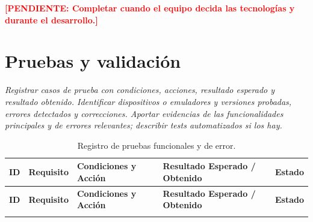 \documentclass[11pt,a4paper]{article}
\newcommand{\pendiente}[1]{\textcolor{red}{\textbf{[PENDIENTE: #1]}}}
\begin{document}
\pendiente{Completar cuando el equipo decida las tecnologías y durante el desarrollo.}

\section{Pruebas y validación}
\textit{Registrar casos de prueba con condiciones, acciones, resultado esperado y resultado obtenido. Identificar dispositivos o emuladores y versiones probadas, errores detectados y correcciones. Aportar evidencias de las funcionalidades principales y de errores relevantes; describir tests automatizados si los hay.}

\begin{longtable}{L{1.3cm} L{1.9cm} L{3.9cm} L{4.6cm} L{1.9cm}}
\caption{Registro de pruebas funcionales y de error.}\\
\toprule
\textbf{ID} & \textbf{Requisito} & \textbf{Condiciones y Acción} & \textbf{Resultado Esperado / Obtenido} & \textbf{Estado} \\
\midrule
\endfirsthead
\toprule
\textbf{ID} & \textbf{Requisito} & \textbf{Condiciones y Acción} & \textbf{Resultado Esperado / Obtenido} & \textbf{Estado} \\
\midrule
\endhead
\endfoot
\bottomrule
\endlastfoot


\end{longtable}
\end{document}
